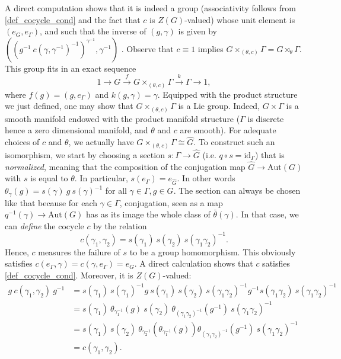 A direct computation shows that it is indeed a group (associativity follows from \eqref{def_cocycle_cond} and the fact that \(c\) is \(Z(G)\)-valued) whose unit element is \((e_G, e_\Gamma)\), and such that the inverse of \((g, \gamma)\) is given by \(((g^{-1}\ c(\gamma, \gamma^{-1})^{-1})^{\gamma^{-1}} , \gamma^{-1})\) \parencite[Lemma 18.1.9]{hilgert2011structure}. Observe that \(c\equiv 1\) implies \(G\times_{(\theta, c)}\Gamma=G \rtimes_\theta \Gamma\). This group fits in an exact sequence
\[
1 \to G \xrightarrow{f} G \times_{(\theta, c)} \Gamma \xrightarrow{k} \Gamma \to 1,
\]
where \(f(g)=(g, e_\Gamma)\) and \(k(g,\gamma)=\gamma\). Equipped with the product structure we just defined, one may show that \(G \times_{(\theta, c)}\Gamma\) is a Lie group. Indeed, \(G \times \Gamma\) is a smooth manifold endowed with the product manifold structure (\(\Gamma\) is discrete hence a zero dimensional manifold, and \(\theta\) and \(c\) are smooth). For adequate choices of \(c\) and \(\theta\), we actually have \(G \times_{(\theta, c)} \Gamma \cong \hat{G}\). To construct such an isomorphism, we start by choosing a section \(s\colon \Gamma \to \hat{G}\) (i.e. \(q \circ s=\mathrm{id}_\Gamma\)) that is \textit{normalized}, meaning that the composition of the conjugation map \(\hat{G} \to \mathrm{Aut}(G)\) with \(s\) is equal to \(\theta\). In particular, \(s(e_\Gamma)=e_{\hat{G}}\). In other words \(\theta_\gamma(g)=s(\gamma)\ g \ s(\gamma)^{-1}\) for all \(\gamma \in \Gamma, g \in G\). The section can always be chosen like that because for each \(\gamma \in \Gamma\), conjugation, seen as a map \(q^{-1}(\gamma) \to \mathrm{Aut}(G)\) has as its image the whole class of \(\bar{\theta}(\gamma)\). In that case, we can \textit{define} the cocycle \(c\) by the relation 
\[
 c(\gamma_1, \gamma_2)= s(\gamma_1) \ s(\gamma_2) \ s(\gamma_1 \gamma_2)^{-1}.
\]
Hence, \(c\) measures the failure of \(s\) to be a group homomorphism. This obviously satisfies \(c(e_\Gamma, \gamma)=c(\gamma, e_\Gamma)=e_G\). A direct calculation shows that \(c\) satisfies \eqref{def_cocycle_cond}. Moreover, it is \(Z(G)\)-valued:
\begin{align*}
    g \ c(\gamma_1, \gamma_2) \ g^{-1} & = s(\gamma_1) \ s(\gamma_1)^{-1} g\  s(\gamma_1) \ s(\gamma_2) \ s(\gamma_1 \gamma_2)^{-1} g^{-1} s(\gamma_1 \gamma_2) \ s(\gamma_1 \gamma_2)^{-1} \\
    & = s(\gamma_1) \ \theta_{\gamma_1^{-1}}(g)\  s(\gamma_2) \  \theta_{(\gamma_1 \gamma_2)^{-1}}(g^{-1})\  s(\gamma_1 \gamma_2)^{-1} \\
    & = s(\gamma_1) \ s(\gamma_2) \ \theta_{\gamma_2^{-1}}(\theta_{\gamma_1^{-1}}(g)) \theta_{(\gamma_1 \gamma_2)^{-1}}(g^{-1})\  s(\gamma_1 \gamma_2)^{-1}\\&=c(\gamma_1, \gamma_2).
\end{align*}
